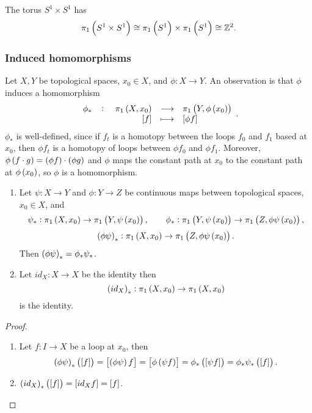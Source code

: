 \begin{example*}
The torus $ S^1 \times S^1 $ has
$$ \pi_1\br{S^1 \times S^1} \cong \pi_1\br{S^1} \times \pi_1\br{S^1} \cong \Z^2. $$
\end{example*}

\pagebreak

\subsubsection{Induced homomorphisms}

Let $ X, Y $ be topological spaces, $ x_0 \in X $, and $ \phi : X \to Y $. An observation is that $ \phi $ induces a homomorphism
$$ \function[\phi_*]{\pi_1\br{X, x_0}}{\pi_1\br{Y, \phi\br{x_0}}}{\sbr{f}}{\sbr{\phi f}}. $$
$ \phi_* $ is well-defined, since if $ f_t $ is a homotopy between the loops $ f_0 $ and $ f_1 $ based at $ x_0 $, then $ \phi f_t $ is a homotopy of loops between $ \phi f_0 $ and $ \phi f_1 $. Moreover, $ \phi\br{f \cdot g} = \br{\phi f} \cdot \br{\phi g} $ and $ \phi $ maps the constant path at $ x_0 $ to the constant path at $ \phi\br{x_0} $, so $ \phi $ is a homomorphism.

\begin{proposition}
\hfill
\begin{enumerate}
\item Let $ \psi : X \to Y $ and $ \phi : Y \to Z $ be continuous maps between topological spaces, $ x_0 \in X $, and
$$ \psi_* : \pi_1\br{X, x_0} \to \pi_1\br{Y, \psi\br{x_0}}, \qquad \phi_* : \pi_1\br{Y, \psi\br{x_0}} \to \pi_1\br{Z, \phi\psi\br{x_0}}, $$
$$ \br{\phi\psi}_* : \pi_1\br{X, x_0} \to \pi_1\br{Z, \phi\psi\br{x_0}}. $$
Then $ \br{\phi\psi}_* = \phi_*\psi_* $.
\item Let $ id_X : X \to X $ be the identity then
$$ \br{id_X}_* : \pi_1\br{X, x_0} \to \pi_1\br{X, x_0} $$
is the identity.
\end{enumerate}
\end{proposition}

\begin{proof}
\hfill
\begin{enumerate}
\item Let $ f : I \to X $ be a loop at $ x_0 $, then
$$ \br{\phi\psi}_*\br{\sbr{f}} = \sbr{\br{\phi\psi}f} = \sbr{\phi\br{\psi f}} = \phi_*\br{\sbr{\psi f}} = \phi_*\psi_*\br{\sbr{f}}. $$
\item $ \br{id_X}_*\br{\sbr{f}} = \sbr{id_Xf} = \sbr{f} $.
\end{enumerate}
\end{proof}

